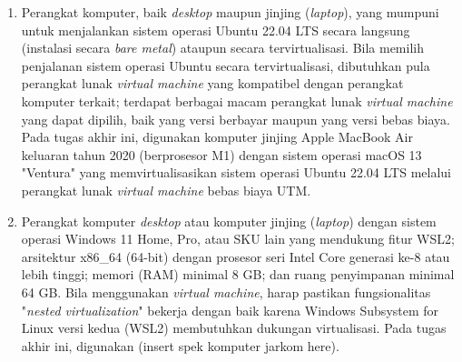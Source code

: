 \begin{enumerate}
    \item Perangkat komputer, baik \textit{desktop} maupun jinjing (\textit{laptop}), yang mumpuni untuk menjalankan sistem operasi Ubuntu 22.04 LTS secara langsung (instalasi secara \textit{bare metal}) ataupun secara tervirtualisasi. Bila memilih penjalanan sistem operasi Ubuntu secara tervirtualisasi, dibutuhkan pula perangkat lunak \textit{virtual machine} yang kompatibel dengan perangkat komputer terkait; terdapat berbagai macam perangkat lunak \textit{virtual machine} yang dapat dipilih, baik yang versi berbayar maupun yang versi bebas biaya. Pada tugas akhir ini, digunakan komputer jinjing Apple MacBook Air keluaran tahun 2020 (berprosesor M1) dengan sistem operasi macOS 13 "Ventura" yang memvirtualisasikan sistem operasi Ubuntu 22.04 LTS melalui perangkat lunak \textit{virtual machine} bebas biaya UTM.
    \item Perangkat komputer \textit{desktop} atau komputer jinjing (\textit{laptop}) dengan sistem operasi Windows 11 Home, Pro, atau SKU lain yang mendukung fitur WSL2; arsitektur x86\_64 (64-bit) dengan prosesor seri Intel Core generasi ke-8 atau lebih tinggi; memori (RAM) minimal 8 GB; dan ruang penyimpanan minimal 64 GB. Bila menggunakan \textit{virtual machine}, harap pastikan fungsionalitas "\textit{nested virtualization}" bekerja dengan baik karena Windows Subsystem for Linux versi kedua (WSL2) membutuhkan dukungan virtualisasi. Pada tugas akhir ini, digunakan (insert spek komputer jarkom here).

\end{enumerate}
